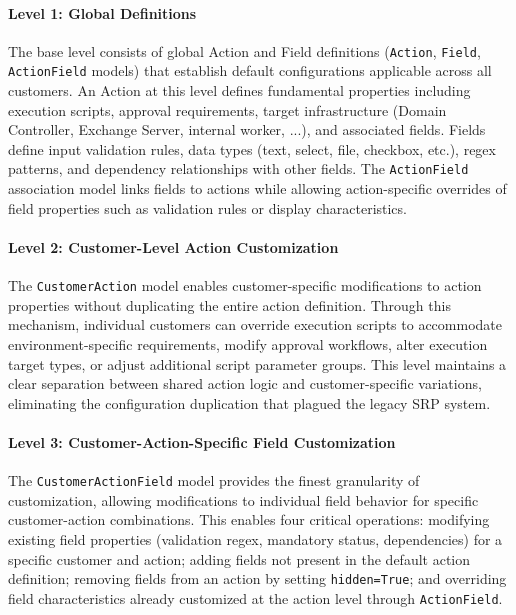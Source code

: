 \paragraph{Level 1: Global Definitions}
The base level consists of global Action and Field definitions (\texttt{Action}, \texttt{Field}, \texttt{ActionField} models) that establish default configurations applicable across all customers. An Action at this level defines fundamental properties including execution scripts, approval requirements, target infrastructure (Domain Controller, Exchange Server, internal worker, ...), and associated fields. Fields define input validation rules, data types (text, select, file, checkbox, etc.), regex patterns, and dependency relationships with other fields. The \texttt{ActionField} association model links fields to actions while allowing action-specific overrides of field properties such as validation rules or display characteristics.

\paragraph{Level 2: Customer-Level Action Customization}
The \texttt{CustomerAction} model enables customer-specific modifications to action properties without duplicating the entire action definition. Through this mechanism, individual customers can override execution scripts to accommodate environment-specific requirements, modify approval workflows, alter execution target types, or adjust additional script parameter groups. This level maintains a clear separation between shared action logic and customer-specific variations, eliminating the configuration duplication that plagued the legacy SRP system.

\paragraph{Level 3: Customer-Action-Specific Field Customization}
The \texttt{CustomerActionField} model provides the finest granularity of customization, allowing modifications to individual field behavior for specific customer-action combinations. This enables four critical operations: modifying existing field properties (validation regex, mandatory status, dependencies) for a specific customer and action; adding fields not present in the default action definition; removing fields from an action by setting \texttt{hidden=True}; and overriding field characteristics already customized at the action level through \texttt{ActionField}.

